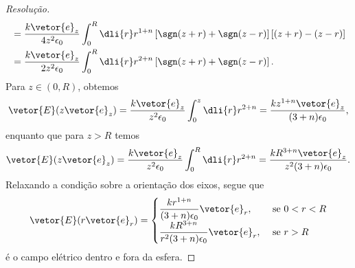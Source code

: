 \begin{proof}[Resolução]
\begin{align*}
                                &= \frac{k \vetor{e}_z}{4z^2 \epsilon_0} \int_0^R \dli{r} r^{1+n}\left[\sgn(z+r) + \sgn(z-r)\right]\left[(z + r) - (z - r)\right]\\
                                &= \frac{k \vetor{e}_z}{2z^2 \epsilon_0} \int_0^R \dli{r} r^{2+n}\left[\sgn(z+r) + \sgn(z-r)\right].
    \end{align*}
    Para \(z \in (0, R)\), obtemos
    \begin{align*}
        \vetor{E}(z\vetor{e}_z) = \frac{k \vetor{e}_z}{z^2 \epsilon_0} \int_0^z \dli{r} r^{2+n} = \frac{kz^{1+n} \vetor{e}_z}{(3+n) \epsilon_0},
    \end{align*}
    enquanto que para \(z > R\) temos
    \begin{align*}
        \vetor{E}(z\vetor{e}_z) = \frac{k \vetor{e}_z}{z^2 \epsilon_0} \int_0^R \dli{r} r^{2+n} = \frac{k R^{3+n}\vetor{e}_z}{z^2(3+n) \epsilon_0}.
    \end{align*}
    Relaxando a condição sobre a orientação dos eixos, segue que
    \begin{equation*}
        \vetor{E}(r\vetor{e}_r) = \begin{cases}
            \dfrac{kr^{1+n}}{(3+n)\epsilon_0}\vetor{e}_r, &\text{ se }0 < r < R\\
            \dfrac{kR^{3+n}}{r^2(3+n)\epsilon_0}\vetor{e}_r, &\text{ se }r > R\\
        \end{cases}
    \end{equation*}
    é o campo elétrico dentro e fora da esfera.
\end{proof}
